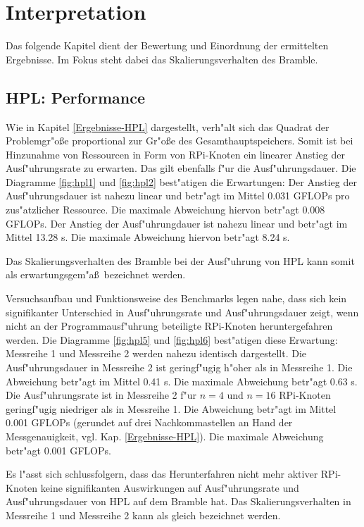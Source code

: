 \chapter{Interpretation}\label{Kap4}

Das folgende Kapitel dient der Bewertung und Einordnung der ermittelten Ergebnisse. Im Fokus steht dabei das Skalierungsverhalten des Bramble.    

\section{HPL: Performance}\label{Interpretation-Linpack}
Wie in Kapitel \ref{Ergebnisse-HPL} dargestellt, verh"alt sich das Quadrat der Problemgr"o\ss e proportional zur Gr"o\ss e des Gesamthauptspeichers. Somit ist bei Hinzunahme von Ressourcen in Form von RPi-Knoten ein linearer Anstieg der Ausf"uhrungsrate zu erwarten. Das gilt ebenfalls f"ur die Ausf"uhrungsdauer. Die Diagramme \ref{fig:hpl1} und \ref{fig:hpl2} best"atigen die Erwartungen: Der Anstieg der Ausf"uhrungsdauer ist nahezu linear und betr"agt im Mittel 0.031 GFLOPs pro zus"atzlicher Ressource. Die maximale Abweichung hiervon betr"agt 0.008 GFLOPs. Der Anstieg der Ausf"uhrungdauer ist nahezu linear und betr"agt im Mittel 13.28 s. Die maximale Abweichung hiervon betr"agt 8.24 s.

Das Skalierungsverhalten des Bramble bei der Ausf"uhrung von HPL kann somit als erwartungsgem"a\ss\ bezeichnet werden.

Versuchsaufbau und Funktionsweise des Benchmarks legen nahe, dass sich kein signifikanter Unterschied in Ausf"uhrungsrate und Ausf"uhrungsdauer zeigt, wenn nicht an der Programmausf"uhrung beteiligte RPi-Knoten heruntergefahren werden. Die Diagramme \ref{fig:hpl5} und \ref{fig:hpl6} best"atigen diese Erwartung: Messreihe 1 und Messreihe 2 werden nahezu identisch dargestellt. Die Ausf"uhrungsdauer in Messreihe 2 ist geringf"ugig h"oher als in Messreihe 1. Die Abweichung betr"agt im Mittel 0.41 s. Die maximale Abweichung betr"agt 0.63 s. Die Ausf"uhrungsrate ist in Messreihe 2 f"ur $n=4$ und $n=16$ RPi-Knoten geringf"ugig niedriger als in Messreihe 1. Die Abweichung betr"agt im Mittel 0.001 GFLOPs (gerundet auf drei Nachkommastellen an Hand der Messgenauigkeit, vgl. Kap. \ref{Ergebnisse-HPL}). Die maximale Abweichung betr"agt 0.001 GFLOPs. 

Es l"asst sich schlussfolgern, dass das Herunterfahren nicht mehr aktiver RPi-Knoten keine signifikanten Auswirkungen auf Ausf"uhrungsrate und Ausf"uhrungsdauer von HPL auf dem Bramble hat. Das Skalierungsverhalten in Messreihe 1 und Messreihe 2 kann als gleich bezeichnet werden. 

